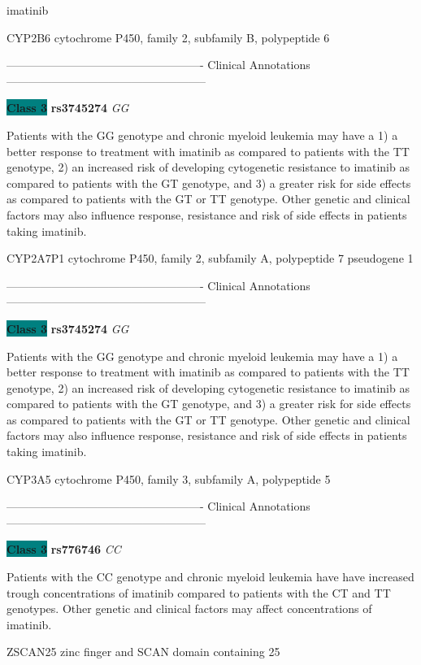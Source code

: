 \documentclass{resume} %
\begin{document}
\begin{rSection}{ imatinib }
\begin{rSubsection}{ CYP2B6 }{ cytochrome P450, family 2, subfamily B, polypeptide 6 }{}{}
\item[] ---------------------------------------------------- Clinical Annotations -----------------------------------------------------\newline
\item \textbf{\colorbox{teal} {Class 3}} \textbf{ rs3745274 } \textit{ GG }
\item[] Patients with the GG genotype and chronic myeloid leukemia may have a 1) a better response to treatment with imatinib as compared to patients with the TT genotype, 2) an increased risk of developing cytogenetic resistance to imatinib as compared to patients with the GT genotype, and 3) a greater risk for side effects as compared to patients with the GT or TT genotype. Other genetic and clinical factors may also influence response, resistance and risk of side effects in patients taking imatinib.
\end{rSubsection}\begin{rSubsection}{ CYP2A7P1 }{ cytochrome P450, family 2, subfamily A, polypeptide 7 pseudogene 1 }{}{}
\item[]

\item[] ---------------------------------------------------- Clinical Annotations -----------------------------------------------------\newline
\item \textbf{\colorbox{teal} {Class 3}} \textbf{ rs3745274 } \textit{ GG }
\item[] Patients with the GG genotype and chronic myeloid leukemia may have a 1) a better response to treatment with imatinib as compared to patients with the TT genotype, 2) an increased risk of developing cytogenetic resistance to imatinib as compared to patients with the GT genotype, and 3) a greater risk for side effects as compared to patients with the GT or TT genotype. Other genetic and clinical factors may also influence response, resistance and risk of side effects in patients taking imatinib.
\end{rSubsection}\begin{rSubsection}{ CYP3A5 }{ cytochrome P450, family 3, subfamily A, polypeptide 5 }{}{}
\item[]

\item[] ---------------------------------------------------- Clinical Annotations -----------------------------------------------------\newline
\item \textbf{\colorbox{teal} {Class 3}} \textbf{ rs776746 } \textit{ CC }
\item[] Patients with the CC genotype and chronic myeloid leukemia have have increased trough concentrations of imatinib compared to patients with the CT and TT genotypes. Other genetic and clinical factors may affect concentrations of imatinib.
\end{rSubsection}\begin{rSubsection}{ ZSCAN25 }{ zinc finger and SCAN domain containing 25 }{}{}
\item[]


\end{rSubsection}
\end{rSection}
\end{document}
